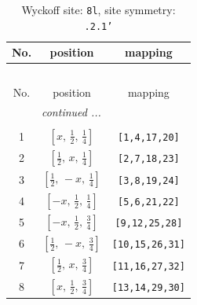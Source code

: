 \documentclass[fleqn,8pt]{jsarticle}
\begin{document}
\begin{longtable}{ccc}
\caption{Wyckoff site: {\tt 8l}, site symmetry: {\tt .2.1'}}
 \\
 \hline \hline
No. & position & mapping \\ \hline \endfirsthead

\multicolumn{2}{l}{\tablename\ \thetable{}} \\
 \hline \hline
No. & position & mapping \\ \hline \endhead

 \hline \hline
\multicolumn{2}{r}{\footnotesize\it continued ...} \\ \endfoot

 \hline \hline
\multicolumn{2}{r}{} \\ \endlastfoot

1 & $\left[ x,\, \frac{1}{2},\, \frac{1}{4} \right]$ & {\tt [1,4,17,20]} \\ \hline
2 & $\left[ \frac{1}{2},\, x,\, \frac{1}{4} \right]$ & {\tt [2,7,18,23]} \\ \hline
3 & $\left[ \frac{1}{2},\, - x,\, \frac{1}{4} \right]$ & {\tt [3,8,19,24]} \\ \hline
4 & $\left[ - x,\, \frac{1}{2},\, \frac{1}{4} \right]$ & {\tt [5,6,21,22]} \\ \hline
5 & $\left[ - x,\, \frac{1}{2},\, \frac{3}{4} \right]$ & {\tt [9,12,25,28]} \\ \hline
6 & $\left[ \frac{1}{2},\, - x,\, \frac{3}{4} \right]$ & {\tt [10,15,26,31]} \\ \hline
7 & $\left[ \frac{1}{2},\, x,\, \frac{3}{4} \right]$ & {\tt [11,16,27,32]} \\ \hline
8 & $\left[ x,\, \frac{1}{2},\, \frac{3}{4} \right]$ & {\tt [13,14,29,30]} \\
\end{longtable}
\renewcommand{\arraystretch}{1.2}
\end{document}
